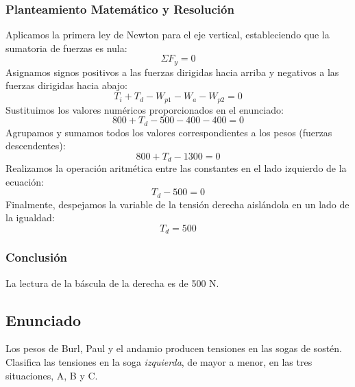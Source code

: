 \documentclass[12pt,letterpaper]{article}
\begin{document}
\subsubsection*{Planteamiento Matemático y Resolución}
Aplicamos la primera ley de Newton para el eje vertical, estableciendo que la sumatoria de fuerzas es nula:
$$\Sigma F_{y}=0$$
Asignamos signos positivos a las fuerzas dirigidas hacia arriba y negativos a las fuerzas dirigidas hacia abajo:
$$T_{i}+T_{d}-W_{p1}-W_{a}-W_{p2}=0$$
Sustituimos los valores numéricos proporcionados en el enunciado:
$$800+T_{d}-500-400-400=0$$
Agrupamos y sumamos todos los valores correspondientes a los pesos (fuerzas descendentes):
$$800+T_{d}-1300=0$$
Realizamos la operación aritmética entre las constantes en el lado izquierdo de la ecuación:
$$T_{d}-500=0$$
Finalmente, despejamos la variable de la tensión derecha aislándola en un lado de la igualdad:
$$T_{d}=500$$

\subsubsection*{Conclusión}
La lectura de la báscula de la derecha es de 500 N.

\newpage

\subsection*{Enunciado}
Los pesos de Burl, Paul y el andamio producen tensiones en las sogas de sostén. Clasifica las tensiones en la soga \textit{izquierda}, de mayor a menor, en las tres situaciones, A, B y C.
\end{document}
